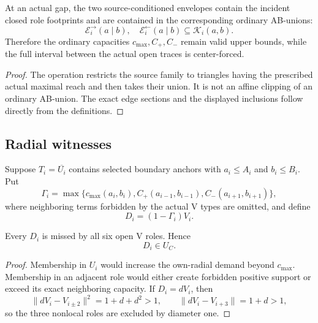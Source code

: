 \begin{proposition}
\label{prop:readable-trace-exact-ab-interface}
At an actual gap, the two source-conditioned envelopes contain the incident
closed role footprints and are contained in the corresponding ordinary
AB-unions:
\[
 \mathcal E_i^{\rightarrow}(a\mid b),\quad
 \mathcal E_i^{\leftarrow}(a\mid b)
 \subseteq\mathcal K_i(a,b).
\]
Therefore the ordinary capacities $c_{\max},C_+,C_-$ remain valid upper
bounds, while the full interval between the actual open traces is
center-forced.
\end{proposition}



\begin{proof}
The operation restricts the source family to triangles having the prescribed
actual maximal reach and then takes their union.  It is not an affine clipping
of an ordinary AB-union.  The exact edge sections and the displayed
inclusions follow directly from the definitions.
\end{proof}





\subsection{Radial witnesses}

Suppose $T_i=\overline{U_i}$ contains selected boundary anchors with
$a_i\le A_i$ and $b_i\le B_i$.  Put
\[
 \Gamma_i=
 \max\{c_{\max}(a_i,b_i),C_+(a_{i-1},b_{i-1}),
 C_-(a_{i+1},b_{i+1})\},
\]
where neighboring terms forbidden by the actual V types are omitted, and
define
\[
 D_i=(1-\Gamma_i)V_i.
 \tag{6.25}
\]

\begin{lemma}
\label{lem:new-type-aware-radial-forcing}
Every $D_i$ is missed by all six open V roles.  Hence
\[
 \boxed{D_i\in U_C.}
\]
\end{lemma}

\begin{proof}
Membership in $U_i$ would increase the own-radial demand beyond
$c_{\max}$.  Membership in an adjacent role would either create forbidden
positive support or exceed its exact neighboring capacity.  If
$D_i=dV_i$, then
\[
 \|dV_i-V_{i\pm2}\|^2=1+d+d^2>1,
 \qquad
 \|dV_i-V_{i+3}\|=1+d>1,
\]
so the three nonlocal roles are excluded by diameter one.
\end{proof}


